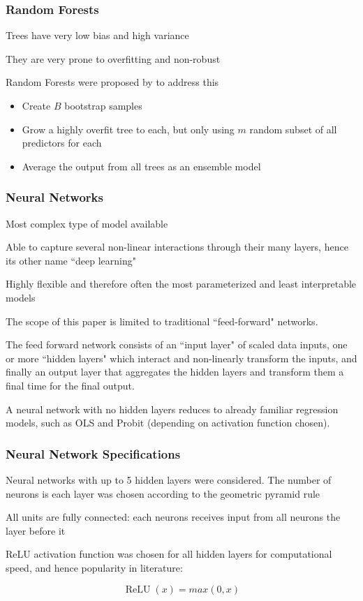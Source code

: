 \documentclass[]{beamer}
\begin{document}
\begin{frame}
\frametitle{Random Forests}
Trees have very low bias and high variance

They are very prone to overfitting and non-robust

Random Forests were proposed by \cite{breiman_random_2001} to address this
\begin{itemize}
	\item Create $B$ bootstrap samples
	\item Grow a highly overfit tree to each, but only using $m$ random subset of all predictors for each
	\item Average the output from all trees as an ensemble model
\end{itemize}
\end{frame}


\begin{frame}
\frametitle{Neural Networks}
Most complex type of model available

Able to capture several non-linear interactions through their many layers, hence its other name ``deep learning" 

Highly flexible and therefore often the most parameterized and least interpretable models

The scope of this paper is limited to traditional ``feed-forward" networks. 
\end{frame}

\begin{frame}
The feed forward network consists of an ``input layer" of scaled data inputs, one or more ``hidden layers" which interact and non-linearly transform the inputs, and finally an output layer that aggregates the hidden layers and transform them a final time for the final output. 

A neural network with no hidden layers reduces to already familiar regression models, such as OLS and Probit (depending on activation function chosen).



\end{frame}

\begin{frame}
\frametitle{Neural Network Specifications}
Neural networks with up to 5 hidden layers were considered. The number of neurons is each layer was chosen according to the geometric pyramid rule \citep{masters_practical_1993}

All units are fully connected: each neurons receives input from all neurons the layer before it

ReLU activation function was chosen for all hidden layers for computational speed, and hence popularity in literature:

\begin{equation}
\operatorname{ReLU}(x) = max(0, x)
\end{equation}
\end{frame}
\end{document}
